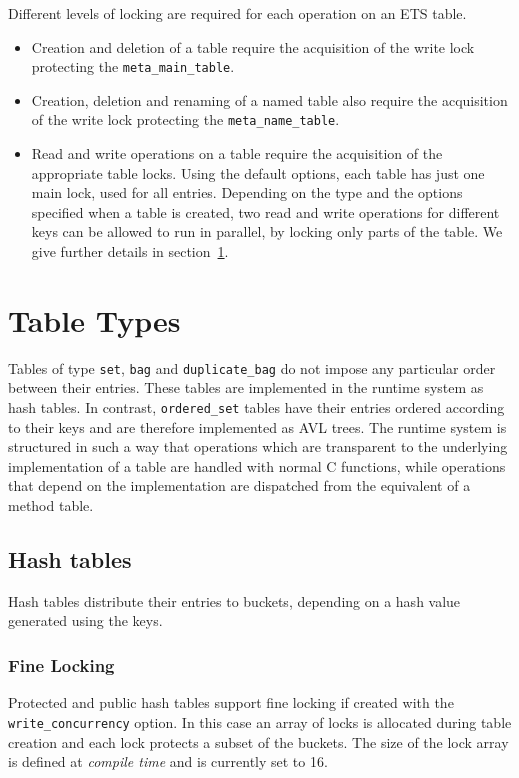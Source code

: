 \documentclass[aps,pre,preprint,nofootinbib]{revtex4}
\begin{document}
Different levels of locking are required for each operation on an ETS table.

\begin{itemize}
\item Creation and deletion of a table require the acquisition of the write lock protecting the \verb|meta_main_table|.
\item Creation, deletion and renaming of a named table also require the acquisition of the write lock protecting the \verb|meta_name_table|.
\item Read and write operations on a table require the acquisition of the appropriate table locks.
  Using the default options, each table has just one main lock, used for all entries.
  Depending on the type and the options specified when a table is created, two read and write operations for different keys can be allowed to run in parallel, by locking only parts of the table.
  We give further details in section~\ref{sec:table_types}.
\end{itemize}

\section{Table Types} \label{sec:table_types}

Tables of type \verb|set|, \verb|bag| and \verb|duplicate_bag| do not impose any particular order between their entries.
These tables are implemented in the runtime system as hash tables.
In contrast, \verb|ordered_set| tables have their entries ordered according to their keys and are therefore implemented as AVL trees.
The runtime system is structured in such a way that operations which are transparent to the underlying implementation of a table are handled with normal C functions, while operations that depend on the implementation are dispatched from the equivalent of a method table.

\subsection{Hash tables}

Hash tables distribute their entries to buckets, depending on a hash value generated using the keys.


\subsubsection{Fine Locking}

Protected and public hash tables support fine locking if created with the \verb|write_concurrency| option.
In this case an array of locks is allocated during table creation and each lock protects a subset of the buckets.
The size of the lock array is defined at \emph{compile time} and is currently set to 16.
\end{document}
